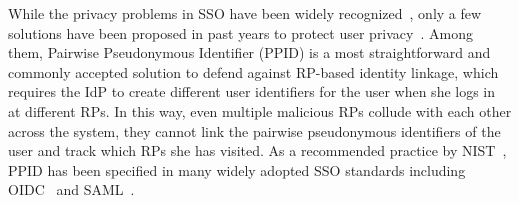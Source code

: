 


While the privacy problems in SSO have been widely recognized~\cite{maler2008venn,NIST2017draft}, only a few solutions have been proposed in past years to protect user privacy~\cite{persona,SPRESSO}. Among them, Pairwise Pseudonymous Identifier (PPID) is a most straightforward and commonly accepted solution to defend against RP-based identity linkage, which requires the IdP to create different user identifiers for the user when she logs in at different RPs. In this way, even multiple malicious RPs collude with each other across the system, they cannot link the  pairwise pseudonymous identifiers of the user and track which RPs she has visited. As a recommended practice by NIST~\cite{NIST2017draft}, PPID has been specified in many widely adopted SSO standards including OIDC~\cite{OpenIDConnect} and SAML~\cite{SAMLIdentifier}.


